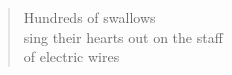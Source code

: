 \documentclass[a4paper,12pt]{article}
\begin{document}
\begin{verse}
  Hundreds of swallows \\
  sing their hearts out on the staff \\
  of electric wires
\end{verse}
\end{document}
